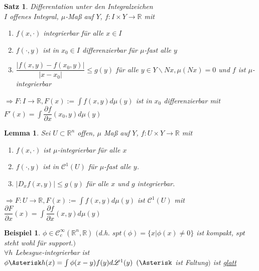 \documentclass[11pt]{memoir}
\theoremstyle{changebreak}
\newtheorem{Beispiel}{Beispiel}[chapter]
\newtheorem{Lemma}{Lemma}[chapter]
\newtheorem{Satz}{Satz}[chapter]
\begin{document}
\begin{Satz}
\emph{Differentation unter den Integralzeichen} \\
$I$ offenes Integral, $\mu$-Maß auf $Y$, $f: I \times Y \rightarrow \mathbb R$ mit
\begin{enumerate}
	\item $f(x, \cdotp)$ integrierbar für alle $x \in I$
	\item $f(\cdotp, y)$ ist in $x_0 \in I$ differenzierbar für $\mu$-fast alle $y$
	\item $\dfrac{|f(x, y) - f(x_0, y)|}{|x - x_0|} \leq g(y)$ für alle $y \in Y \backslash Nx, \mu(Nx)= 0$ und $f$ ist $\mu$-integrierbar \\
\end{enumerate}
$\Rightarrow F: I \rightarrow \mathbb R, F(x):= \int f(x, y)d\mu(y)$ ist in $x_0$ differenzierbar mit $ F'(x) = \int \dfrac{\partial f}{\partial x}(x_0, y) d\mu(y)$

\end{Satz}

\begin{Lemma}
Sei $U \subset \mathbb R^n$ offen, $\mu$ Maß auf $Y$, $f: U \times Y \rightarrow \mathbb R$ mit
\begin{enumerate}
	\item $f(x, \cdotp)$ ist $\mu$-integrierbar für alle $x$
	\item $f(\cdotp, y)$ ist in $\mathscr C^1(U)$ für $\mu$-fast alle $y$.
	\item $|D_x f(x, y)| \leq g(y)$ für alle $x$ und $g$ integrierbar.
\end{enumerate}
$\Rightarrow F: U \rightarrow \mathbb R, F(x):= \int f(x, y) d\mu(y)$ ist $\mathscr C^1(U)$ mit $\dfrac{\partial F}{\partial x}(x) = \int \dfrac{\partial f}{\partial x}(x, y) d\mu(y)$
\end{Lemma}

\begin{Beispiel}
$\phi \in \mathscr C_c^\infty(\mathbb R^n, \mathbb R)$ $($d.h. $spt(\phi) =\{x| \phi(x) \ne 0\}$ ist kompakt, $spt$ steht wohl für support.$)$  \\
$\forall h$ Lebesgue-integrierbar ist \\
$\phi \Asterisk h(x) = \int \phi(x-y)f(y) d\mathscr L^1(y)$ $(\Asterisk$ ist \emph{Faltung}$)$ ist \underline{glatt}
\end{Beispiel}
\end{document}
